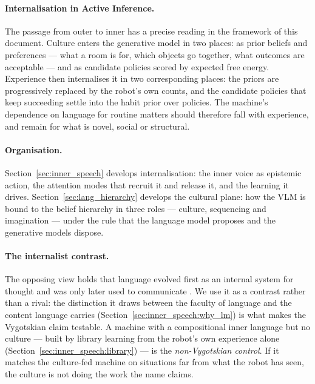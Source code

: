 \paragraph{Internalisation in Active Inference.}
The passage from outer to inner has a precise reading in the framework of this document. Culture enters the
generative model in two places: as prior beliefs and preferences --- what a room is for, which objects go together,
what outcomes are acceptable --- and as candidate policies scored by expected free energy. Experience then
internalises it in two corresponding places: the priors are progressively replaced by the robot's own counts, and
the candidate policies that keep succeeding settle into the habit prior over policies. The machine's dependence on
language for routine matters should therefore fall with experience, and remain for what is novel, social or
structural.

\paragraph{Organisation.}
Section~\ref{sec:inner_speech} develops internalisation: the inner voice as epistemic action, the attention modes
that recruit it and release it, and the learning it drives. Section~\ref{sec:lang_hierarchy} develops the cultural
plane: how the VLM is bound to the belief hierarchy in three roles --- culture, sequencing and imagination --- under
the rule that the language model proposes and the generative models dispose.

\paragraph{The internalist contrast.}
The opposing view holds that language evolved first as an internal system for thought and was only later used to
communicate \cite{berwick2016why}. We use it as a contrast rather than a rival: the distinction it draws between the
faculty of language and the content language carries (Section~\ref{sec:inner_speech:why_lm}) is what makes the
Vygotskian claim testable. A machine with a compositional inner language but no culture --- built by library
learning from the robot's own experience alone (Section~\ref{sec:inner_speech:library}) --- is the
\emph{non-Vygotskian control}. If it matches the culture-fed machine on situations far from what the robot has seen,
the culture is not doing the work the name claims.

